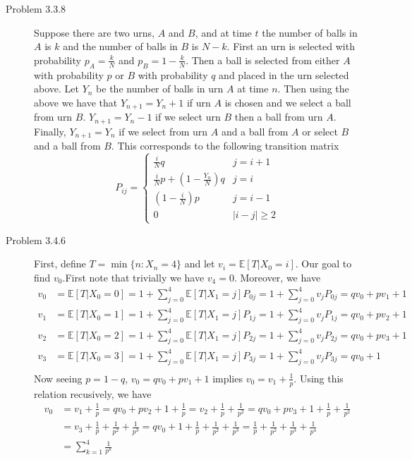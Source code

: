 \documentclass[12pt]{article}  %
\newcommand{\E}{{\mathbb{E}}}
\begin{document}
\begin{description}
\item[Problem 3.3.8] Suppose there are two urns, $A$ and $B$, and at time $t$ the number of balls in $A$ is $k$ and the number of balls in $B$ is $N-k$. First an urn is selected with probability $p_{A} = \frac{k}{N}$ and $p_{B} = 1 - \frac{k}{N}$. Then a ball is selected from either $A$ with probability $p$ or $B$ with probability $q$ and placed in the urn selected above. Let $Y_n$ be the number of balls in urn $A$ at time $n$. Then using the above we have that $Y_{n+1} = Y_n + 1$ if urn $A$ is chosen and we select a ball from urn $B$. $Y_{n+1} = Y_n -1$ if we select urn $B$ then a ball from urn $A$. Finally, $Y_{n+1} = Y_n $ if we select from urn $A$ and a ball from $A$ or select $B$ and a ball from $B$. This corresponds to the following transition matrix 
\[P_{ij} = 
\begin{cases}
\frac{i}{N}q & j = i+1\\
\frac{i}{N}p + (1 - \frac{Y_n}{N})q & j = i\\
(1 - \frac{i}{N})p & j = i-1\\
0 & |i-j|\geq 2
\end{cases}
\]

\item[Problem 3.4.6] First, define $T = \min\{n:X_{n} = 4\}$ and let $v_i = \E[T|X_0=i]$. Our goal to find $v_0$.First note that trivially we have $v_4 = 0$. Moreover, we have
\begin{align*}
v_0 &= \E[T|X_0 = 0] = 1 + \sum_{j=0}^{4}\E[T|X_1 = j]P_{0j} = 1 + \sum_{j=0}^{4}v_jP_{0j} = qv_0 + pv_1 + 1\\
v_1 &= \E[T|X_0 = 1] = 1 + \sum_{j=0}^{4}\E[T|X_1 = j]P_{1j} = 1 + \sum_{j=0}^{4}v_jP_{1j} = qv_0 + pv_2 + 1\\
v_2 &= \E[T|X_0 = 2] = 1 + \sum_{j=0}^{4}\E[T|X_1 = j]P_{2j} = 1 + \sum_{j=0}^{4}v_jP_{2j} = qv_0 + pv_3 + 1\\
v_3 &= \E[T|X_0 = 3] = 1 + \sum_{j=0}^{4}\E[T|X_1 = j]P_{3j} = 1 + \sum_{j=0}^{4}v_jP_{3j} = qv_0 + 1\\
\end{align*}
Now seeing $p = 1-q$, $v_0 = qv_0 + pv_{1} + 1$ implies $v_0 = v_{1} + \frac{1}{p}$. Using this relation recusively, we have 
\begin{align*}
v_0 &= v_{1} + \frac{1}{p} = qv_0 + pv_2 + 1 + \frac{1}{p} = v_2 + \frac{1}{p} + \frac{1}{p^2}= qv_0 + pv_3 + 1 + \frac{1}{p} + \frac{1}{p^2}\\
&= v_3 + \frac{1}{p} + \frac{1}{p^2} + \frac{1}{p^3}= qv_0 + 1 + \frac{1}{p} + \frac{1}{p^2} + \frac{1}{p^3}= \frac{1}{p} + \frac{1}{p^2} + \frac{1}{p^3} + \frac{1}{p^4}\\
&= \sum_{k = 1}^4\frac{1}{p^k}\\
\end{align*}



\end{description}
\end{document}
